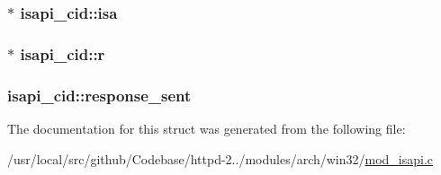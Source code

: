 \subsubsection[{\texorpdfstring{isa}{isa}}]{$\ast$ isapi\+\_\+cid\+::isa}\hypertarget{structisapi__cid_a21548c52b203da95df38a01a5616d108}{}\label{structisapi__cid_a21548c52b203da95df38a01a5616d108}
\subsubsection[{\texorpdfstring{r}{r}}]{$\ast$ isapi\+\_\+cid\+::r}\hypertarget{structisapi__cid_a93104c7dab08de6dcef6882f322c0ebc}{}\label{structisapi__cid_a93104c7dab08de6dcef6882f322c0ebc}
\subsubsection[{\texorpdfstring{response\+\_\+sent}{response_sent}}]{ isapi\+\_\+cid\+::response\+\_\+sent}\hypertarget{structisapi__cid_ad0b3c4b221c4700ce8e51ed9830ae3f0}{}\label{structisapi__cid_ad0b3c4b221c4700ce8e51ed9830ae3f0}


The documentation for this struct was generated from the following file\+:\begin{DoxyCompactItemize}
\item 
/usr/local/src/github/\+Codebase/httpd-\/2../modules/arch/win32/\hyperlink{mod__isapi_8c}{mod\+\_\+isapi.\+c}\end{DoxyCompactItemize}

